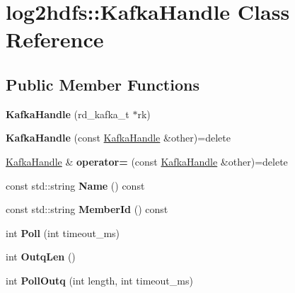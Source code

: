 \hypertarget{classlog2hdfs_1_1KafkaHandle}{}\section{log2hdfs\+:\+:Kafka\+Handle Class Reference}
\label{classlog2hdfs_1_1KafkaHandle}
\subsection*{Public Member Functions}
\begin{DoxyCompactItemize}
\item 
{\bfseries Kafka\+Handle} (rd\+\_\+kafka\+\_\+t $\ast$rk)\hypertarget{classlog2hdfs_1_1KafkaHandle_ab08e203a9156aaed40ac0d479736a859}{}\label{classlog2hdfs_1_1KafkaHandle_ab08e203a9156aaed40ac0d479736a859}

\item 
{\bfseries Kafka\+Handle} (const \hyperlink{classlog2hdfs_1_1KafkaHandle}{Kafka\+Handle} \&other)=delete\hypertarget{classlog2hdfs_1_1KafkaHandle_a9d5d950f6c4e384b7f4c91fef7282d7c}{}\label{classlog2hdfs_1_1KafkaHandle_a9d5d950f6c4e384b7f4c91fef7282d7c}

\item 
\hyperlink{classlog2hdfs_1_1KafkaHandle}{Kafka\+Handle} \& {\bfseries operator=} (const \hyperlink{classlog2hdfs_1_1KafkaHandle}{Kafka\+Handle} \&other)=delete\hypertarget{classlog2hdfs_1_1KafkaHandle_a46082e6923a6fbc9418bd081ca1c6d47}{}\label{classlog2hdfs_1_1KafkaHandle_a46082e6923a6fbc9418bd081ca1c6d47}

\item 
const std\+::string {\bfseries Name} () const \hypertarget{classlog2hdfs_1_1KafkaHandle_a95c896fef8778c28d94942c024e92e12}{}\label{classlog2hdfs_1_1KafkaHandle_a95c896fef8778c28d94942c024e92e12}

\item 
const std\+::string {\bfseries Member\+Id} () const \hypertarget{classlog2hdfs_1_1KafkaHandle_a7357385b93f6fe66890ec72eec98d638}{}\label{classlog2hdfs_1_1KafkaHandle_a7357385b93f6fe66890ec72eec98d638}

\item 
int {\bfseries Poll} (int timeout\+\_\+ms)\hypertarget{classlog2hdfs_1_1KafkaHandle_afcd42efb4beb3897306ba33a04e2dcfc}{}\label{classlog2hdfs_1_1KafkaHandle_afcd42efb4beb3897306ba33a04e2dcfc}

\item 
int {\bfseries Outq\+Len} ()\hypertarget{classlog2hdfs_1_1KafkaHandle_a984f7ae04507456f1331488d31abdeff}{}\label{classlog2hdfs_1_1KafkaHandle_a984f7ae04507456f1331488d31abdeff}

\item 
int {\bfseries Poll\+Outq} (int length, int timeout\+\_\+ms)\hypertarget{classlog2hdfs_1_1KafkaHandle_ac851515e9f365206b53c8b067933408d}{}\label{classlog2hdfs_1_1KafkaHandle_ac851515e9f365206b53c8b067933408d}

\end{DoxyCompactItemize}
